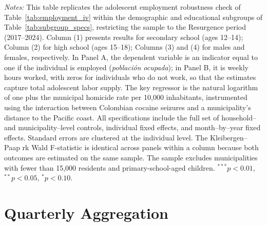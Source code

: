 \documentclass[12pt,letter,english,intoc,bibliography=totoc,index=totoc,BCOR10mm,captions=tableheading,nottitlepage,fleqn]{article}
\theoremstyle{break}
\begin{document}
\begin{table}[H]
\centering
\caption{Adolescent Employment Estimates by Subgroup: Resurgence (2017--2024)}
\label{tab:employment_subgroups}
\centering
\scriptsize

\begin{minipage}{0.95\linewidth}
    \scriptsize \singlespacing
    \textit{Notes:} This table replicates the adolescent employment robustness check of Table~\ref{tab:employment_iv} within the demographic and educational subgroups of Table~\ref{tab:subgroup_specs}, restricting the sample to the Resurgence period (2017--2024). Column (1) presents results for secondary school (ages 12--14); Column (2) for high school (ages 15--18); Columns (3) and (4) for males and females, respectively. In Panel A, the dependent variable is an indicator equal to one if the individual is employed (\textit{poblaci\'{o}n ocupada}); in Panel B, it is weekly hours worked, with zeros for individuals who do not work, so that the estimates capture total adolescent labor supply. The key regressor is the natural logarithm of one plus the municipal homicide rate per 10{,}000 inhabitants, instrumented using the interaction between Colombian cocaine seizures and a municipality's distance to the Pacific coast. All specifications include the full set of household-- and municipality--level controls, individual fixed effects, and month--by--year fixed effects. Standard errors are clustered at the individual level. The Kleibergen--Paap rk Wald F-statistic is identical across panels within a column because both outcomes are estimated on the same sample. The sample excludes municipalities with fewer than 15{,}000 residents and primary-school-aged children. $^{***}p<0.01$, $^{**}p<0.05$, $^{*}p<0.10$.
    \end{minipage}
\end{table}

\section{Quarterly Aggregation}
\label{sec:quarterly_appendix}
\end{document}
